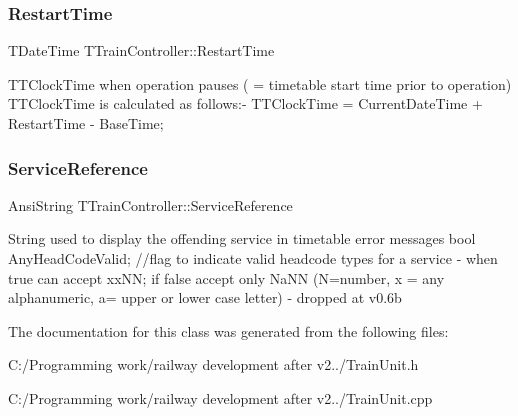 \subsubsection{\texorpdfstring{Restart\+Time}{RestartTime}}
{\footnotesize\ttfamily T\+Date\+Time T\+Train\+Controller\+::\+Restart\+Time}

T\+T\+Clock\+Time when operation pauses ( = timetable start time prior to operation) T\+T\+Clock\+Time is calculated as follows\+:-\/ T\+T\+Clock\+Time = Current\+Date\+Time + Restart\+Time -\/ Base\+Time; \mbox{\label{class_t_train_controller_a1b103ff111456f178286d97002b63afb}} 
\subsubsection{\texorpdfstring{Service\+Reference}{ServiceReference}}
{\footnotesize\ttfamily Ansi\+String T\+Train\+Controller\+::\+Service\+Reference}

String used to display the offending service in timetable error messages bool Any\+Head\+Code\+Valid; //flag to indicate valid headcode types for a service -\/ when true can accept xx\+NN; if false accept only Na\+NN (N=number, x = any alphanumeric, a= upper or lower case letter) -\/ dropped at v0.\+6b 

The documentation for this class was generated from the following files\+:\begin{DoxyCompactItemize}
\item 
C\+:/\+Programming work/railway development after v2../Train\+Unit.\+h\item 
C\+:/\+Programming work/railway development after v2../Train\+Unit.\+cpp\end{DoxyCompactItemize}
